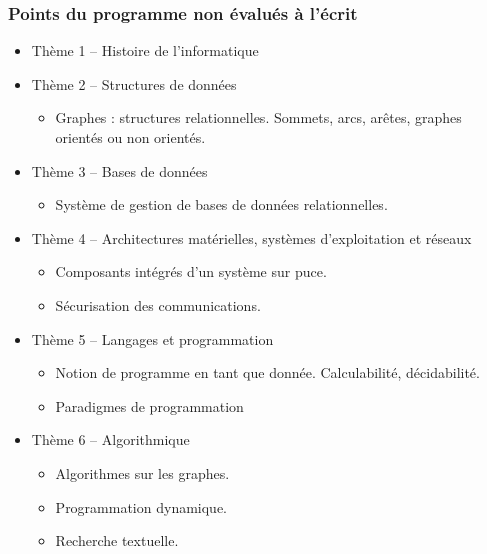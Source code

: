 \documentclass[
  letterpaper,
  DIV=11,
  numbers=noendperiod]{scrartcl}
\providecommand{\tightlist}{%
  \setlength{\itemsep}{0pt}\setlength{\parskip}{0pt}}\usepackage{longtable,booktabs,array}
\begin{document}
\hypertarget{points-du-programme-non-uxe9valuuxe9s-uxe0-luxe9crit}{%
\subsubsection{Points du programme non évalués à
l'écrit}\label{points-du-programme-non-uxe9valuuxe9s-uxe0-luxe9crit}}

\begin{itemize}
\item
  Thème 1 -- Histoire de l'informatique
\item
  Thème 2 -- Structures de données

  \begin{itemize}
  \tightlist
  \item
    Graphes : structures relationnelles. Sommets, arcs, arêtes, graphes
    orientés ou non orientés.
  \end{itemize}
\item
  Thème 3 -- Bases de données

  \begin{itemize}
  \tightlist
  \item
    Système de gestion de bases de données relationnelles.
  \end{itemize}
\item
  Thème 4 -- Architectures matérielles, systèmes d'exploitation et
  réseaux

  \begin{itemize}
  \tightlist
  \item
    Composants intégrés d'un système sur puce.
  \item
    Sécurisation des communications.
  \end{itemize}
\item
  Thème 5 -- Langages et programmation

  \begin{itemize}
  \tightlist
  \item
    Notion de programme en tant que donnée. Calculabilité, décidabilité.
  \item
    Paradigmes de programmation
  \end{itemize}
\item
  Thème 6 -- Algorithmique

  \begin{itemize}
  \tightlist
  \item
    Algorithmes sur les graphes.
  \item
    Programmation dynamique.
  \item
    Recherche textuelle.
  \end{itemize}
\end{itemize}
\end{document}
